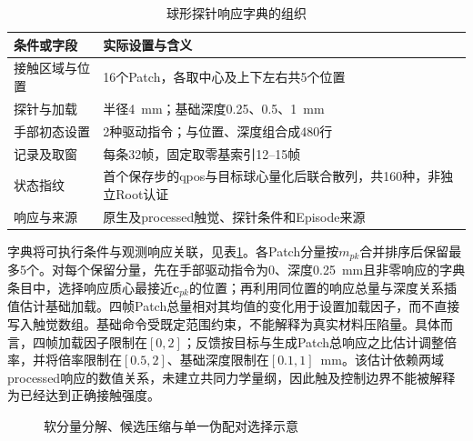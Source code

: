 \begin{table}[htbp]
 \centering\small
 \caption{球形探针响应字典的组织}
 \label{tab:ch05_probe_dictionary}
 \begin{tabular}{p{}p{}}
 \hline
 条件或字段 & 实际设置与含义\\
 \hline
 接触区域与位置 & 16个Patch，各取中心及上下左右共5个位置\\
 探针与加载 & 半径4~mm；基础深度0.25、0.5、1~mm\\
 手部初态设置 & 2种驱动指令；与位置、深度组合成480行\\
 记录及取窗 & 每条32帧，固定取零基索引12--15帧\\
 状态指纹 & 首个保存步的qpos与目标球心量化后联合散列，共160种，非独立Root认证\\
 响应与来源 & 原生及processed触觉、探针条件和Episode来源\\
 \hline
 \end{tabular}
\end{table}

字典将可执行条件与观测响应关联，见表\ref{tab:ch05_probe_dictionary}。各Patch分量按$m_{pk}$合并排序后保留最多5个。对每个保留分量，先在手部驱动指令为0、深度0.25~mm且非零响应的字典条目中，选择响应质心最接近$\boldsymbol c_{pk}$的位置；再利用同位置的响应总量与深度关系插值估计基础加载。四帧Patch总量相对其均值的变化用于设置加载因子，而不直接写入触觉数组。基础命令受既定范围约束，不能解释为真实材料压陷量。具体而言，四帧加载因子限制在$[0,2]$；反馈按目标与生成Patch总响应之比估计调整倍率，并将倍率限制在$[0.5,2]$、基础深度限制在$[0.1,1]$~mm。该估计依赖两域processed响应的数值关系，未建立共同力学量纲，因此触及控制边界不能被解释为已经达到正确接触强度。

\begin{figure}[htbp]
 \centering
 \caption{软分量分解、候选压缩与单一伪配对选择示意}
 \label{fig:ch05_gmm_candidate_selection}
\end{figure}


